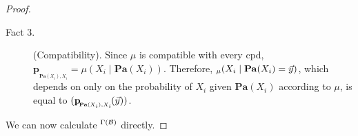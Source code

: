 \documentclass{article}
\theoremstyle{plain}
\theoremstyle{definition}
\theoremstyle{remark}
\let\H\relax
\DeclareMathOperator{\H}{\mathrm{H}} %
\newcommand\mat[1]{\mathbf{#1}}
\newcommand{\bp}[1][L]{\mat{p}_{\!_{#1}\!}}
\newcommand{\dg}[1]{\mathfrak{#1}}
\newcommand\Pa{\mathbf{Pa}}
\newcommand\extrsymb{\mathit{Extra}}
\newcommand\extrainfo[2][\dg M]{\extrsymb(#2;#1)}
\newcommand\PDGof{\Gamma}
\numberwithin{equation}{section}
\begin{document}
\begin{proof}
\begin{description}
			\item[Fact 3.] (Compatibility). Since $\mu$ is compatible with every cpd, $\bp[\Pa(X_i),X_i] = \mu(X_i \mid \Pa(X_i))$. Therefore, $\H_\mu(X_i \mid \Pa(X_i) = \vec y) $, which depends on only on the probability of $X_i$ given $\Pa(X_i)$ according to $\mu$, is equal to $\H(\bp[\Pa(X_i),X_i](\vec y))$. 
		\end{description}
		We can now calculate $\H^{\PDGof(\cal B)}$ directly.
		
		

\end{proof}
\end{document}
